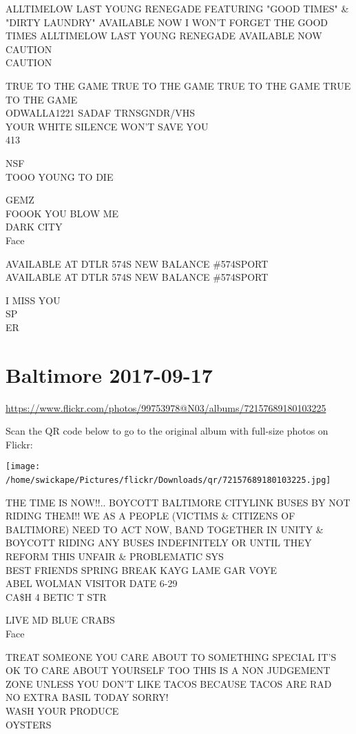 \documentclass[10pt,letterpaper]{article}
\begin{document}
ALLTIMELOW LAST YOUNG RENEGADE FEATURING "GOOD TIMES" \& "DIRTY LAUNDRY" AVAILABLE NOW I WON'T FORGET THE GOOD TIMES ALLTIMELOW LAST YOUNG RENEGADE AVAILABLE NOW\\
CAUTION\\
CAUTION

TRUE TO THE GAME TRUE TO THE GAME TRUE TO THE GAME TRUE TO THE GAME\\
ODWALLA1221 SADAF TRNSGNDR/VHS\\
YOUR WHITE SILENCE WON'T SAVE YOU\\
413

NSF\\
TOOO YOUNG TO DIE

GEMZ\\
FOOOK YOU BLOW ME\\
DARK CITY\\
Face

AVAILABLE AT DTLR 574S NEW BALANCE \#574SPORT\\
AVAILABLE AT DTLR 574S NEW BALANCE \#574SPORT

I MISS YOU\\
SP\\
ER
\

\section*{Baltimore 2017-09-17}

\url{https://www.flickr.com/photos/99753978@N03/albums/72157689180103225}

Scan the QR code below to go to the original album with full-size photos on Flickr:

\texttt{[image: /home/swickape/Pictures/flickr/Downloads/qr/72157689180103225.jpg]}
\

THE TIME IS NOW!!..  BOYCOTT BALTIMORE CITYLINK BUSES BY NOT RIDING THEM!!  WE AS A PEOPLE (VICTIMS \& CITIZENS OF BALTIMORE) NEED TO ACT NOW, BAND TOGETHER IN UNITY \& BOYCOTT RIDING ANY BUSES INDEFINITELY OR UNTIL THEY REFORM THIS UNFAIR \& PROBLEMATIC SYS\\
BEST FRIENDS SPRING BREAK KAYG LAME GAR VOYE\\
ABEL WOLMAN VISITOR DATE 6{-}29\\
CA\$H 4 BETIC T STR

LIVE MD BLUE CRABS\\
Face

TREAT SOMEONE YOU CARE ABOUT TO SOMETHING SPECIAL IT'S OK TO CARE ABOUT YOURSELF TOO THIS IS A NON JUDGEMENT ZONE UNLESS YOU DON'T LIKE TACOS BECAUSE TACOS ARE RAD\\
NO EXTRA BASIL TODAY SORRY!\\
WASH YOUR PRODUCE\\
OYSTERS
\end{document}

